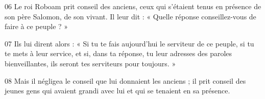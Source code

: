 
06 Le roi Roboam prit conseil des anciens, ceux qui s’étaient tenus en présence de son père Salomon, de son vivant. Il leur dit : « Quelle réponse conseillez-vous de faire à ce peuple ? »

07 Ils lui dirent alors : « Si tu te fais aujourd’hui le serviteur de ce peuple, si tu te mets à leur service, et si, dans ta réponse, tu leur adresses des paroles bienveillantes, ils seront tes serviteurs pour toujours. »

08 Mais il négligea le conseil que lui donnaient les anciens ; il prit conseil des jeunes gens qui avaient grandi avec lui et qui se tenaient en sa présence.
